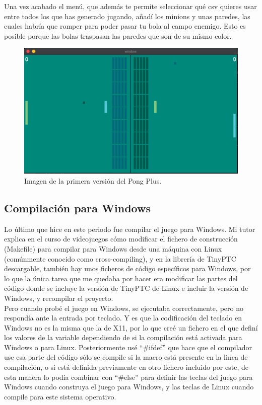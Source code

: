 Una vez acabado el menú, que además te permite seleccionar qué \gls{csv} quieres usar entre todos los que has generado jugando, añadí los minions y unas paredes, las cuales habría que romper para poder pasar tu bola al campo enemigo. Esto es posible porque las bolas traspasan las paredes que son de su mismo color.

\begin{figure}[H]
	\centering
	\includegraphics[width=12cm]{archivos/imagenes/pong-plus-con-minions-y-paredes.png}
	\caption{Imagen de la primera versión del Pong Plus.}
\end{figure}

\subsection{Compilación para Windows}
Lo último que hice en este periodo fue compilar el juego para Windows. Mi tutor explica en el curso de videojuegos \cite{CursoMotorC++} cómo modificar el fichero de construcción (Makefile) para compilar para Windows desde una máquina con Linux (comúnmente conocido como cross-compiling), y en la librería de TinyPTC descargable, también hay unos ficheros de código específicos para Windows, por lo que la única tarea que me quedaba por hacer era modificar las partes del código donde se incluye la versión de TinyPTC de Linux e incluir la versión de Windows, y recompilar el proyecto. 
\\
Pero cuando probé el juego en Windows, se ejecutaba correctamente, pero no respondía ante la entrada por teclado. Y es que la codificación del teclado en Windows no es la misma que la de X11, por lo que creé un fichero en el que definí los valores de la variable dependiendo de si la compilación está activada para Windows o para Linux. Posteriormente usé ``\#ifdef'' que hace que el compilador use esa parte del código sólo se compile si la macro está presente en la linea de compilación, o si está definida previamente en otro fichero incluido por este, de esta manera lo podía combinar con ``\#else'' para definir las teclas del juego para Windows cuando construya el juego para Windows, y las teclas de Linux cuando compile para este sistema operativo.

